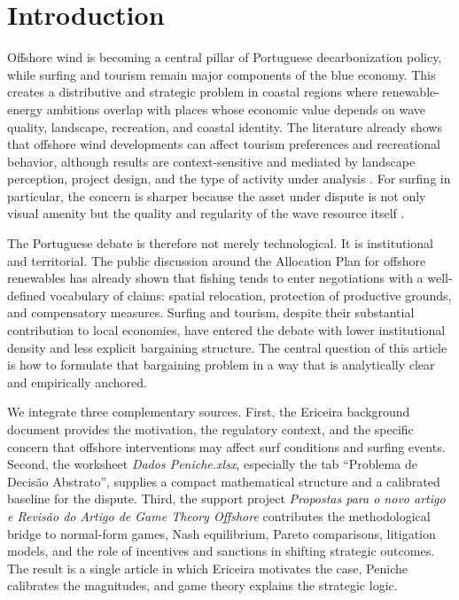 \documentclass[final,times,authoryear]{elsarticle}
\begin{document}
\section{Introduction}
\label{sec_introduction}

Offshore wind is becoming a central pillar of Portuguese decarbonization policy, while surfing and tourism remain major components of the blue economy. This creates a distributive and strategic problem in coastal regions where renewable-energy ambitions overlap with places whose economic value depends on wave quality, landscape, recreation, and coastal identity. The literature already shows that offshore wind developments can affect tourism preferences and recreational behavior, although results are context-sensitive and mediated by landscape perception, project design, and the type of activity under analysis \citep{machado_implications_2023,oh_impacts_2023,trandafir_how_2020,voltaire_public_2020,smythe_beyond_2020}. For surfing in particular, the concern is sharper because the asset under dispute is not only visual amenity but the quality and regularity of the wave resource itself \citep{sewage_guidance_2009}.

The Portuguese debate is therefore not merely technological. It is institutional and territorial. The public discussion around the Allocation Plan for offshore renewables has already shown that fishing tends to enter negotiations with a well-defined vocabulary of claims: spatial relocation, protection of productive grounds, and compensatory measures. Surfing and tourism, despite their substantial contribution to local economies, have entered the debate with lower institutional density and less explicit bargaining structure. The central question of this article is how to formulate that bargaining problem in a way that is analytically clear and empirically anchored.

We integrate three complementary sources. First, the Ericeira background document provides the motivation, the regulatory context, and the specific concern that offshore interventions may affect surf conditions and surfing events. Second, the worksheet \textit{Dados Peniche.xlsx}, especially the tab ``Problema de Decisão Abstrato'', supplies a compact mathematical structure and a calibrated baseline for the dispute. Third, the support project \textit{Propostas para o novo artigo e Revisão do Artigo de Game Theory Offshore} contributes the methodological bridge to normal-form games, Nash equilibrium, Pareto comparisons, litigation models, and the role of incentives and sanctions in shifting strategic outcomes. The result is a single article in which Ericeira motivates the case, Peniche calibrates the magnitudes, and game theory explains the strategic logic.
\end{document}
